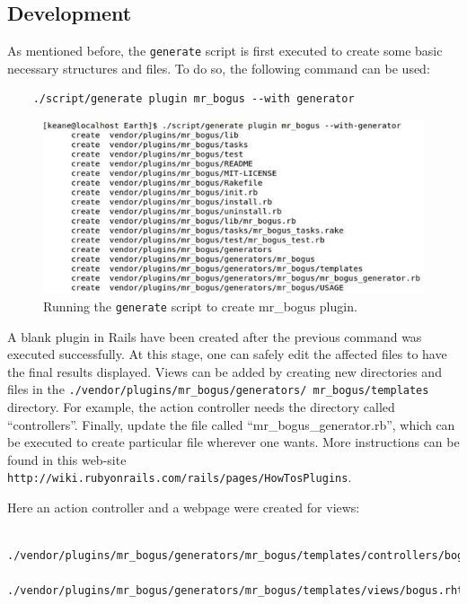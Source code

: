 \documentclass{article}
\begin{document}

\subsection{Development} %

As mentioned before, the \texttt{generate} script is first executed to create some basic necessary structures and files. To do so, the following command can be used:

\begin{verbatim}
    ./script/generate plugin mr_bogus --with generator
\end{verbatim}

\begin{figure}
    \centering
    \includegraphics[scale=0.7]{fig/instruction-2.jpg}
    \caption{Running the \texttt{generate} script to create mr\_bogus plugin.}
    \label{fig:instruction-2}
\end{figure}

A blank plugin in Rails have been created after the previous command was executed successfully. At this stage, one can safely edit the affected files to have the final results displayed. Views can be added by creating new directories and files in the \texttt{./vendor/plugins/mr\_bogus/generators/ mr\_bogus/templates} directory. For example, the action controller needs the directory called ``controllers''. Finally, update the file called ``mr\_bogus\_generator.rb'', which can be executed to create particular file wherever one wants. More instructions can be found in this web-site \texttt{http://wiki.rubyonrails.com/rails/pages/HowTosPlugins}.

Here an action controller and a webpage were created for views:

\begin{verbatim}
    ./vendor/plugins/mr_bogus/generators/mr_bogus/templates/controllers/bogus_controller.rb
    ./vendor/plugins/mr_bogus/generators/mr_bogus/templates/views/bogus.rhtml
\end{verbatim}
\end{document}
